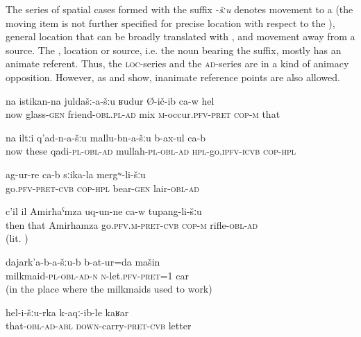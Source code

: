 The series of spatial cases formed with the suffix -\textit{šːu} denotes movement to a  (the moving item is not further specified for precise location with respect to the ), general location that can be broadly translated with , and movement away from a source. The , location or source, i.e. the noun bearing the  suffix, mostly has an animate referent. Thus, the \textsc{loc}-series and the \textsc{ad}-series are in a kind of animacy opposition. However, as  and  show, inanimate reference points are also allowed.
%
\begin{exe}
	\ex	\label{ex:He mingled with his drinking friends}
	\gll	na	istikan-na	juldašː-a-šːu	ʁudur	Ø-ič-ib ca-w	hel\\
		now	glass-\textsc{gen}	friend-\textsc{obl}.\textsc{pl}-\textsc{ad}	mix	\textsc{m}-occur.\textsc{pfv}-\textsc{pret} \textsc{cop-m}	that\\
	\glt	{}
	
	\ex	\label{ex:They go to the qadis, to the mullahs}
	\gll	na	iltːi	q'ad-n-a-šːu	mallu-bn-a-šːu	b-ax-ul ca-b \\
		now	these	qadi-\textsc{pl}-\textsc{obl}-\textsc{ad}	mullah-\textsc{pl}-\textsc{obl}-\textsc{ad}	\textsc{hpl}-go.\textsc{ipfv}-\textsc{icvb} \textsc{cop-hpl}\\
	\glt	{}
	
	\ex	\label{ex:They went to the cave of the bear}
	\gll	ag-ur-re ca-b	sːika-la	mergʷ-li-šːu \\
		go.\textsc{pfv}-\textsc{pret}-\textsc{cvb} \textsc{cop-hpl}	bear-\textsc{gen}	lair-\textsc{obl}-\textsc{ad}\\
	\glt	{}
	
	\ex	\label{ex:Then Amirhamza took a rifle}
	\gll	c'il	il	Amirħaˁmza	uq-un-ne ca-w	tupang-li-šːu\\
		then	that	Amirhamza	go.\textsc{pfv.m}-\textsc{pret}-\textsc{cvb} \textsc{cop-m} rifle-\textsc{obl}-\textsc{ad}\\
	\glt	{} (lit. )
	
	\ex	\label{ex:(We) left the car with the milkmaids}
	\gll	dajark'a-b-a-šːu-b	b-at-ur=da	mašin\\
		milkmaid-\textsc{pl}-\textsc{obl}-\textsc{ad}-\textsc{n}	\textsc{n}-let.\textsc{pfv}-\textsc{pret}=1	car\\
	\glt	{} (in the place where the milkmaids used to work)
	
	\ex	\label{ex:From him (they) brought a permission}
	\gll	hel-i-šːu-rka	k-aqː-ib-le	kaʁar\\
		that-\textsc{obl}-\textsc{ad}-\textsc{abl}	\textsc{down}-carry-\textsc{pret}-\textsc{cvb}	letter\\
	\glt	{}
\end{exe}


